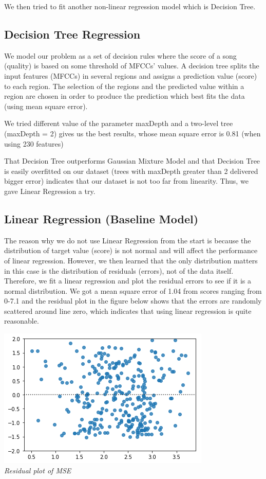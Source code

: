 \documentclass[paper=a4, fontsize=11pt, DIV=13]{scrartcl}
\begin{document}
We then tried to fit another non-linear regression model which is Decision Tree.

\subsection{Decision Tree Regression}
We model our problem as a set of decision rules where the score of a song (quality) is based on some threshold of MFCCs’ values. A decision tree splits the input features (MFCCs) in several regions and assigns a prediction value (score) to each region. The selection of the regions and the predicted value within a region are chosen in order to produce the prediction which best fits the data (using mean square error).

We tried different value of the parameter maxDepth and a two-level tree (maxDepth = 2) gives us the best results, whose mean square error is 0.81 (when using 230 features)

That Decision Tree outperforms Gaussian Mixture Model and that Decision Tree is easily overfitted on our dataset (trees with maxDepth greater than 2 delivered bigger error) indicates that our dataset is not too far from linearity. Thus, we gave Linear Regression a try.

\subsection{Linear Regression (Baseline Model)}
The reason why we do not use Linear Regression from the start is because the distribution of target value (score) is not normal and will affect the performance of linear regression. However, we then learned that the only distribution matters in this case is the distribution of residuals (errors), not of the data itself. Therefore, we fit a linear regression and plot the residual errors to see if it is a normal distribution. We got a mean square error of 1.04 from scores ranging from 0-7.1 and the residual plot in the figure below shows that the errors are randomly scattered around line zero, which indicates that using linear regression is quite reasonable. 

\begin{center}
\includegraphics[scale=0.9]{img/2.png}\\
\textit{Residual plot of MSE}\\
\end{center}
\end{document}
